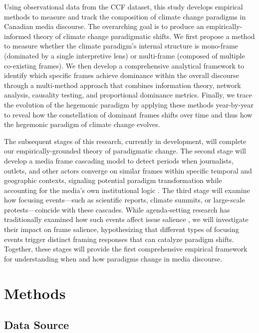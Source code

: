 \documentclass[12pt]{article}
\begin{document}
Using observational data from the CCF dataset, this study develops empirical methods to measure and track the composition of climate change paradigms in Canadian media discourse. The overarching goal is to produce an empirically-informed theory of climate change paradigmatic shifts. We first propose a method to measure whether the climate paradigm's internal structure is mono-frame (dominated by a single interpretive lens) or multi-frame (composed of multiple co-existing frames). We then develop a comprehensive analytical framework to identify which specific frames achieve dominance within the overall discourse through a multi-method approach that combines information theory, network analysis, causality testing, and proportional dominance metrics. Finally, we trace the evolution of the hegemonic paradigm by applying these methods year-by-year to reveal how the constellation of dominant frames shifts over time and thus how the hegemonic paradigm of climate change evolves.

The subsequent stages of this research, currently in development, will complete our empirically-grounded theory of paradigmatic change. The second stage will develop a media frame cascading model to detect periods when journalists, outlets, and other actors converge on similar frames within specific temporal and geographic contexts, signaling potential paradigm transformation while accounting for the media's own institutional logic \autocite{cookGoverningNewsSecond2005, esserMediatizationPoliticsUnderstanding2014}. The third stage will examine how focusing events—such as scientific reports, climate summits, or large-scale protests—coincide with these cascades. While agenda-setting research has traditionally examined how such events affect issue salience \autocite{kingdonAgendasAlternativesPublic1984, birklandDisasterAgendaSetting1997, baumgartnerAgendasInstabilityAmerican2009}, we will investigate their impact on frame salience, hypothesizing that different types of focusing events trigger distinct framing responses that can catalyze paradigm shifts. Together, these stages will provide the first comprehensive empirical framework for understanding when and how paradigms change in media discourse.

\newpage
\section{Methods}

\subsection{Data Source}
\end{document}
